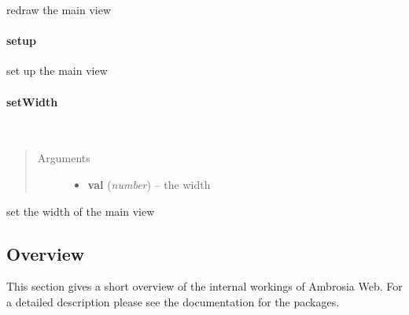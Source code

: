 \documentclass[letterpaper,10pt,english]{sphinxmanual}
\begin{document}
redraw the main view


\paragraph{setup}
\label{ambrosia_web.view.mainview.MainView:setup}

\begin{fulllineitems}
\label{ambrosia_web.view.mainview.MainView:ambrosia_web.view.mainview.MainView.setup}
\end{fulllineitems}


set up the main view


\paragraph{setWidth}
\label{ambrosia_web.view.mainview.MainView:setwidth}

\begin{fulllineitems}
\label{ambrosia_web.view.mainview.MainView:ambrosia_web.view.mainview.MainView.setWidth}~\begin{quote}\begin{description}
\item[{Arguments}] \leavevmode\begin{itemize}
\item {} 
\textbf{val} (\emph{number}) -- the width

\end{itemize}

\end{description}\end{quote}

\end{fulllineitems}


set the width of the main view


\subsection{Overview}
\label{client:overview}
This section gives a short overview of the internal workings of Ambrosia Web. For a detailed description please see the
documentation for the packages.
\end{document}
